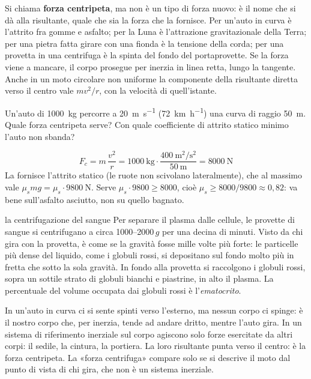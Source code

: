 Si chiama \textbf{forza centripeta}, ma non è un tipo di forza nuovo: è il nome che si dà alla risultante, quale che sia la forza che la fornisce. Per un'auto in curva è l'attrito fra gomme e asfalto; per la Luna è l'attrazione gravitazionale della Terra; per una pietra fatta girare con una fionda è la tensione della corda; per una provetta in una centrifuga è la spinta del fondo del portaprovette. Se la forza viene a mancare, il corpo prosegue per inerzia in linea retta, lungo la tangente. Anche in un moto circolare non uniforme la componente della risultante diretta verso il centro vale $m v^2/r$, con la velocità di quell'istante.

\begin{esempio}
Un'auto di \SI{1000}{\kilo\gram} percorre a \SI{20}{\metre\per\second} (\SI{72}{\kilo\metre\per\hour}) una curva di raggio \SI{50}{\metre}. Quale forza centripeta serve? Con quale coefficiente di attrito statico minimo l'auto non sbanda?

\[
  F_c = m\,\frac{v^2}{r} = \SI{1000}{\kilo\gram} \cdot \frac{\SI{400}{\metre\squared\per\second\squared}}{\SI{50}{\metre}} = \SI{8000}{\newton}
\]
La fornisce l'attrito statico (le ruote non scivolano lateralmente), che al massimo vale $\mu_s mg = \mu_s \cdot \SI{9800}{\newton}$. Serve $\mu_s \cdot 9800 \geq 8000$, cioè $\mu_s \geq 8000/9800 \approx 0{,}82$: va bene sull'asfalto asciutto, non su quello bagnato.
\end{esempio}

\begin{applicazione}{la centrifugazione del sangue}
Per separare il plasma dalle cellule, le provette di sangue si centrifugano a circa \num{1000}--\num{2000}\,$g$ per una decina di minuti. Visto da chi gira con la provetta, è come se la gravità fosse mille volte più forte: le particelle più dense del liquido, come i globuli rossi, si depositano sul fondo molto più in fretta che sotto la sola gravità. In fondo alla provetta si raccolgono i globuli rossi, sopra un sottile strato di globuli bianchi e piastrine, in alto il plasma. La percentuale del volume occupata dai globuli rossi è l'\emph{ematocrito}.
\end{applicazione}

\begin{attenzione}
In un'auto in curva ci si sente spinti verso l'esterno, ma nessun corpo ci spinge: è il nostro corpo che, per inerzia, tende ad andare dritto, mentre l'auto gira. In un sistema di riferimento inerziale sul corpo agiscono solo forze esercitate da altri corpi: il sedile, la cintura, la portiera. La loro risultante punta verso il centro: è la forza centripeta. La «forza centrifuga» compare solo se si descrive il moto dal punto di vista di chi gira, che non è un sistema inerziale.
\end{attenzione}

